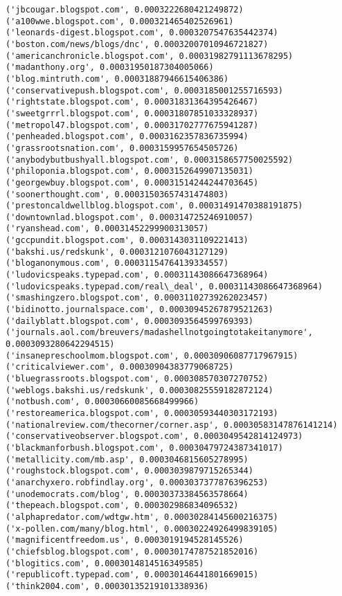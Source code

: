 \documentclass[11pt]{article}
\begin{document}
\begin{Verbatim}[commandchars=\\\{\}]
('jbcougar.blogspot.com', 0.0003222680421249872)
('a100wwe.blogspot.com', 0.000321465402526961)
('leonards-digest.blogspot.com', 0.0003207547635442374)
('boston.com/news/blogs/dnc', 0.00032007010946721827)
('americanchronicle.blogspot.com', 0.00031982791113678295)
('madanthony.org', 0.00031950187304005066)
('blog.mintruth.com', 0.00031887946615406386)
('conservativepush.blogspot.com', 0.0003185001255716593)
('rightstate.blogspot.com', 0.00031831364395426467)
('sweetgrrrl.blogspot.com', 0.00031807851033328937)
('metropol47.blogspot.com', 0.00031702777675941287)
('penheaded.blogspot.com', 0.0003162357836735994)
('grassrootsnation.com', 0.0003159957654505726)
('anybodybutbushyall.blogspot.com', 0.0003158657750025592)
('philoponia.blogspot.com', 0.0003152649907135031)
('georgewbuy.blogspot.com', 0.00031514244244703645)
('soonerthought.com', 0.00031503657431474803)
('prestoncaldwellblog.blogspot.com', 0.00031491470388191875)
('downtownlad.blogspot.com', 0.000314725246910057)
('ryanshead.com', 0.00031452299900313057)
('gccpundit.blogspot.com', 0.0003143031109221413)
('bakshi.us/redskunk', 0.0003121076043127129)
('bloganonymous.com', 0.00031154764139334557)
('ludovicspeaks.typepad.com', 0.00031143086647368964)
('ludovicspeaks.typepad.com/real\_deal', 0.00031143086647368964)
('smashingzero.blogspot.com', 0.00031102739262023457)
('bidinotto.journalspace.com', 0.00030945267879521263)
('dailyblatt.blogspot.com', 0.0003093564599769393)
('journals.aol.com/breuvers/madashellnotgoingtotakeitanymore', 0.0003093280642294515)
('insanepreschoolmom.blogspot.com', 0.00030906087717967915)
('criticalviewer.com', 0.00030904383779068725)
('bluegrassroots.blogspot.com', 0.000308570307270752)
('weblogs.bakshi.us/redskunk', 0.00030825559182872124)
('notbush.com', 0.00030660085668499966)
('restoreamerica.blogspot.com', 0.00030593440303172193)
('nationalreview.com/thecorner/corner.asp', 0.00030583147876141214)
('conservativeobserver.blogspot.com', 0.0003049542814124973)
('blackmanforbush.blogspot.com', 0.00030479724387341017)
('metallicity.com/mb.asp', 0.0003046815605278995)
('roughstock.blogspot.com', 0.0003039879715265344)
('anarchyxero.robfindlay.org', 0.0003037377876396253)
('unodemocrats.com/blog', 0.00030373384563578664)
('thepeach.blogspot.com', 0.000302986834096532)
('alphapredator.com/wdtgw.htm', 0.00030284145600216375)
('x-pollen.com/many/blog.html', 0.00030224926499839105)
('magnificentfreedom.us', 0.0003019194528145526)
('chiefsblog.blogspot.com', 0.00030174787521852016)
('blogitics.com', 0.0003014814516349585)
('republicoft.typepad.com', 0.00030146441801669015)
('think2004.com', 0.00030135219101338936)

\end{Verbatim}
\end{document}
